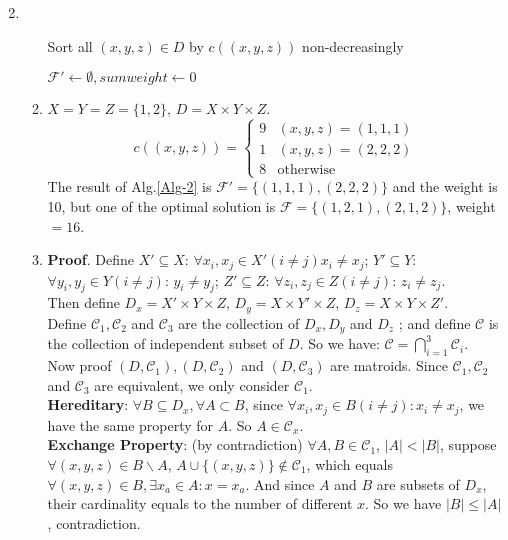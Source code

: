 \documentclass[12pt,a4paper,UTF8]{article}
\makeatletter
\newtheorem*{solution}{Solution}
\theoremstyle{definition}
\renewenvironment{solution}[1][Solution] {\par\pushQED{\qed}\normalfont\topsep6\p@\@plus6\p@\relax\trivlist\item[\hskip\labelsep\bfseries#1\@addpunct{.}]\ignorespaces}{\popQED\endtrivlist\@endpefalse} \makeatother
\makeatother
\begin{document}
\begin{enumerate}
\begin{solution}
\begin{enumerate}
\begin{minipage}[t]{0.89\textwidth}
\begin{algorithm}[H]
					Sort all $ (x,y,z) \in D$ by $ c((x,y,z)) $ non-decreasingly\;
					
					$ \mathcal{F'} \leftarrow \emptyset ,sumweight\leftarrow0$\;
					
					
					\;
					
				\end{algorithm}
			\end{minipage}
			\item $ X = Y = Z = \{1,2\} $, $ D = X\times Y\times Z $.
			$$c((x,y,z))=
			\begin{cases}
			9 &(x,y,z) = (1,1,1)\\
			1 &(x,y,z) = (2,2,2)\\
			8 &\text{otherwise}
			\end{cases}
			$$
			The result of Alg.\ref{Alg-2} is $ \mathcal{F'}=\{(1,1,1),(2,2,2)\} $ and the weight is 10, but one of the optimal solution is $ \mathcal{F}=\{(1,2,1),(2,1,2)\} $, weight$ = 16 $.
			\item
			\textbf{Proof}. Define $ X'\subseteq X$: $ \forall x_i,x_j\in X' (i\neq j) x_i\neq x_j  $; $ Y'\subseteq Y $: $ \forall y_i,y_j\in Y (i\neq j)$: $ y_i\neq y_j$; $ Z' \subseteq Z $: $ \forall z_i,z_j\in Z (i\neq j)$: $ z_i\neq z_j$.\\
			Then define $ D_x= X'\times Y\times Z$, $ D_y= X\times Y'\times Z$, $ D_z= X\times Y\times Z'$. \\ 
			Define $ \mathcal{C}_1,\mathcal{C}_2 $ and $ \mathcal{C}_3 $ are the collection of $ D_x,D_y $ and $ D_z $ ; and define $ \mathcal{C} $ is the collection of independent subset of $ D $. So we have: $ \mathcal{C}=\bigcap_{i=1}^{3} \mathcal{C}_{i} $.\\
			Now proof $ (D,\mathcal{C}_1),(D,\mathcal{C}_2) $ and $ (D,\mathcal{C}_3) $ are matroids. Since $ \mathcal{C}_1,\mathcal{C}_2 $ and $ \mathcal{C}_3 $ are equivalent, we only consider $ \mathcal{C}_1 $.\\
			\textbf{Hereditary}: $ \forall B\subseteq D_x, \forall A \subset B$, since $ \forall x_i,x_j\in B(i\neq j): x_i\neq x_j $, we have the same property for $ A $. So $ A\in\mathcal{C}_x $.\\
			\textbf{Exchange Property}: (by contradiction) $\forall A,B\in \mathcal{C}_1$, $ |A|<|B| $, suppose $ \forall (x,y,z)\in B\backslash A$, $ A\cup \{(x,y,z)\}\notin \mathcal{C}_1$, which equals $ \forall (x,y,z)\in B,\exists x_a \in A: x = x_a $. And since $ A $ and $ B $ are subsets of $ D_x $, their cardinality equals to the number of different $ x $. So we have $ |B|\leq|A| $, contradiction.\\

\end{enumerate}
\end{solution}
\end{enumerate}
\end{document}
